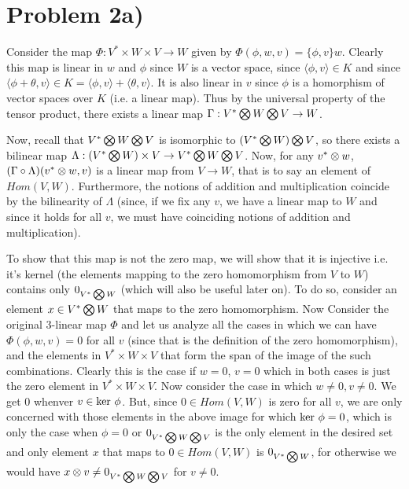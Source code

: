 \section*{Problem 2a)}
Consider the map $\Phi: V^* \times W \times V \to W$ given by $\Phi(\phi, w, v) = \lbrace \phi, v \rbrace w$. Clearly this map is linear in $w$ and $\phi$ since $W$ is a vector space, since $\langle \phi, v \rangle \in K$ and since $\langle \phi+\theta, v \rangle \in K = \langle \phi,v\rangle + \langle \theta, v \rangle$. It is  also linear in $v$ since $\phi$ is a homorphism of vector spaces over $K$ (i.e. a linear map). Thus by the universal property of the tensor product, there exists a linear map $\Gamma: V^* \bigotimes W \bigotimes V \to W$. \par
Now, recall that $V^* \bigotimes W \bigotimes V$ is isomorphic to $(V^* \bigotimes W) \bigotimes V$, so there exists a bilinear map $\Lambda: (V^* \bigotimes W) \times V \to  V^* \bigotimes W \bigotimes V$. Now, for any $v^* \otimes w$, $(\Gamma \circ \Lambda)(v^* \otimes w, v)$ is a linear map from $V\to W$, that is to say an element of $Hom(V,W)$. Furthermore, the notions of addition and multiplication coincide by the bilinearity of $\Lambda$ (since, if we fix any $v$, we have a linear map to $W$ and since it holds for all $v$, we must have coinciding notions of addition and multiplication). \par
To show that this map is not the zero map, we will show that it is injective i.e. it's kernel (the elements mapping to the zero homomorphism from $V$ to $W$) contains only $0_{V^*\bigotimes W}$ (which will also be useful later on). To do so, consider an element $x \in V^* \bigotimes W$ that maps to the zero homomorphism. Now Consider the original 3-linear map $\Phi$ and let us analyze all the cases in which we can have $\Phi(\phi, w, v)=0$ for all $v$ (since that is the definition of the zero homomorphism), and the elements in $V^* \times W \times V$ that form the span of the image of the such combinations. Clearly this is the case if $w=0$, $v=0$ which in both cases is just the zero element in $V^* \times W \times V$. Now consider the case in which $w\neq 0, v\neq 0$. We get 0 whenver $v\in \text{ker }\phi$. But, since $0\in Hom(V,W)$ is zero for all $v$, we are only concerned with those elements in the above image for which $\text{ker } \phi = 0$, which is only the case when $\phi = 0$ or $0_{V^*\bigotimes W \bigotimes V}$ is the only element in the desired set and only element $x$ that maps to $0\in Hom(V,W)$ is $0_{V^*\bigotimes W}$, for otherwise we would have $x \otimes v \neq 0_{V^*\bigotimes W \bigotimes V}$ for $v\neq 0$.

